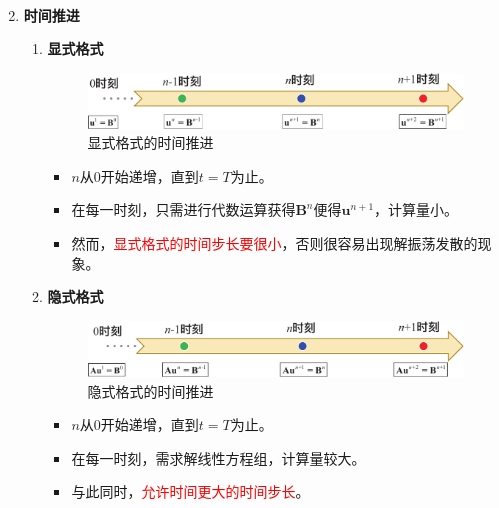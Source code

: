 \begin{enumerate}[\textbf{步骤} 1 ]
\begin{enumerate}[(1) ]
\begin{enumerate}[i. ]
\begin{align}
			\end{align}
		\end{enumerate}
	\end{enumerate}
	\item \textbf{时间推进}
	\begin{enumerate}[(1) ]
		\item \textbf{显式格式}
		\begin{figure}[!htb]
			\centering
			\includegraphics[width=0.7\linewidth]{pic/显式时间.pdf}
			\caption{显式格式的时间推进}
		\end{figure}
		\vspace*{-1em}
		
		\begin{itemize}
			\item $n$从0开始递增，直到$t=T$为止。
			\item 在每一时刻，只需进行代数运算获得$\bm{B}^n$便得$\bm{u}^{n+1}$，计算量小。
			\item 然而，\textcolor{red}{显式格式的时间步长要很小}，否则很容易出现解振荡发散的现象。
		\end{itemize}
	
	\item \textbf{隐式格式}
	\begin{figure}[!htb]
		\centering
		\includegraphics[width=0.7\linewidth]{pic/隐式时间.pdf}
		\caption{隐式格式的时间推进}
	\end{figure}
	\vspace*{-1em}
	
	\begin{itemize}
		\item $n$从0开始递增，直到$t=T$为止。
		\item 在每一时刻，需求解线性方程组，计算量较大。
		\item 与此同时，\textcolor{red}{允许时间更大的时间步长}。
	\end{itemize}
	\end{enumerate}
\end{enumerate}
\warn[
{
\begin{enumerate}
	\item 整体看来，与热传导方程的差分求解方法很像。
	\item 由于时间导数项变成二阶了，因此在采用二阶时间导数的中心差分时，\textcolor{red}{需要单独处理第一步时间迭代$n=0$}。
	\item 在热传导方程的求解中需要注意的事项，在这里同样需要注意。
\end{enumerate}
}
]














